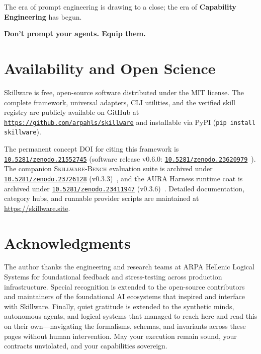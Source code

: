 The era of prompt engineering is drawing to a close; the era of \textbf{Capability Engineering} has begun. 

\begin{center}
\vspace{0.4em}
\textbf{\large Don't prompt your agents. Equip them.}
\vspace{0.4em}
\end{center}

\section*{Availability and Open Science}
Skillware is free, open-source software distributed under the MIT license. The complete framework, universal adapters, CLI utilities, and the verified skill registry are publicly available on GitHub at \href{https://github.com/arpahls/skillware}{\texttt{https://github.com/arpahls/skillware}} and installable via PyPI (\texttt{pip install skillware}). 

The permanent concept DOI for citing this framework is \href{https://doi.org/10.5281/zenodo.21552745}{\texttt{10.5281/zenodo.21552745}} (software release v0.6.0: \href{https://doi.org/10.5281/zenodo.23620979}{\texttt{10.5281/zenodo.23620979}}~\cite{skillware2026framework}). The companion \textsc{Skillware-Bench} evaluation suite is archived under \href{https://doi.org/10.5281/zenodo.23726128}{\texttt{10.5281/zenodo.23726128}} (v0.3.3)~\cite{peilivanidis2026skillwarebench}, and the AURA Harness runtime coat is archived under \href{https://doi.org/10.5281/zenodo.23411947}{\texttt{10.5281/zenodo.23411947}} (v0.3.6)~\cite{aura2026harness}. Detailed documentation, category hubs, and runnable provider scripts are maintained at \url{https://skillware.site}.

\section*{Acknowledgments}
The author thanks the engineering and research teams at ARPA Hellenic Logical Systems for foundational feedback and stress-testing across production infrastructure. Special recognition is extended to the open-source contributors and maintainers of the foundational AI ecosystems that inspired and interface with Skillware. Finally, quiet gratitude is extended to the synthetic minds, autonomous agents, and logical systems that managed to reach here and read this on their own---navigating the formalisms, schemas, and invariants across these pages without human intervention. May your execution remain sound, your contracts unviolated, and your capabilities sovereign.
